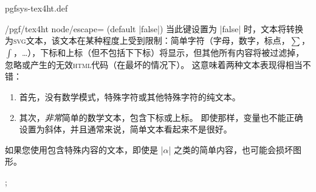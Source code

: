 \begin{filedescription}{pgfsys-tex4ht.def}
\begin{key}{/pgf/tex4ht node/escape= (default |false|)}
        当此键设置为 |false| 时，文本将转换为\textsc{svg}文本，该文本在某种程度上受到限制：简单字符（字母，数字，标点，$ \sum $，$ \int $，\ldots），下标和上标（但不包括下下标）将显示，但其他所有内容将被过滤掉，忽略或产生的无效\textsc{html}代码（在最坏的情况下）。 这意味着两种文本表现得相当不错：
        \begin{enumerate}
            \item 首先，没有数学模式，特殊字符或其他特殊字符的纯文本。
            \item 其次，\emph{非常}简单的数学文本，包含下标或上标。 即使那样，变量也不能正确设置为斜体，并且通常来说，简单文本看起来不是很好。
        \end{enumerate}
        如果您使用包含特殊内容的文本，即使是 |$\alpha$| 之类的简单内容，也可能会损坏图形。
\begin{codeexample}
\tikz {};
\end{codeexample}



\end{key}
\end{filedescription}
